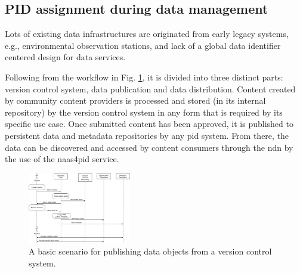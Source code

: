 \documentclass[conference]{IEEEtran}
\begin{document}



\subsection{PID assignment during data management}
Lots of existing data infrastructures are originated from early legacy systems, e.g., environmental observation stations, and lack of a global data identifier centered design for data services.

Following from the workflow in Fig. \ref{fig:sequence}, it is divided into three distinct parts: version control system, data publication and data distribution. Content created by community content providers is processed and stored (in its internal repository) by the version control system in any form that is required by its specific use case. Once submitted content has been approved, it is published to persistent data and metadata repositories by any \gls{pid} system. From there, the data can be discovered and accessed by content consumers through the \gls{ndn} by the use of the \gls{naas4pid} service.

\begin{figure}[ht]
\centering
\includegraphics[width=0.4\textwidth]{images/sequence.png}
\caption{A basic scenario for publishing data objects from a version control system. }
\label{fig:sequence}
\end{figure}
\end{document}

